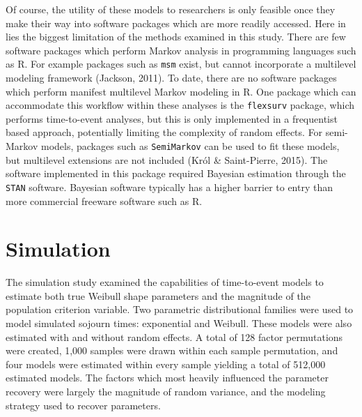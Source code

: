 \documentclass[12pt]{./styles/outhesis}
\begin{document}
Of course, the utility of these models to researchers is only
feasible once they make their way into software packages which are more
readily accessed. Here in lies the biggest limitation of the methods
examined in this study. There are few software packages which
perform Markov analysis in programming languages such as R. For example
packages such as \texttt{msm} exist, but cannot incorporate a multilevel
modeling framework (Jackson, 2011). To date, there are no software
packages which perform manifest multilevel Markov modeling in
R. One package which can accommodate this workflow within these
analyses is the \texttt{flexsurv} package, which performs time-to-event
analyses, but this is only implemented in a frequentist based approach,
potentially limiting the complexity of random effects. For semi-Markov
models, packages such as \texttt{SemiMarkov} can be used to fit these
models, but multilevel extensions are not included (Król \&
Saint-Pierre, 2015). The software implemented in this package required
Bayesian estimation through the \texttt{STAN} software. Bayesian
software typically has a higher barrier to entry than more commercial
freeware software such as R.

\section{Simulation}

The simulation study examined the capabilities of time-to-event models
to estimate both true Weibull shape parameters and the magnitude of the
population criterion variable. Two parametric distributional families
were used to model simulated sojourn times: exponential and Weibull.
These models were also estimated with and without random effects. A
total of 128 factor permutations were created, 1,000 samples were drawn
within each sample permutation, and four models were estimated within
every sample yielding a total of 512,000 estimated models. The factors
which most heavily influenced the parameter recovery were largely the
magnitude of random variance, and the modeling
strategy used to recover parameters.
\end{document}
